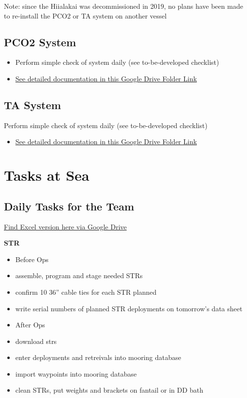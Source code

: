 \documentclass[]{book}
\providecommand{\tightlist}{%
  \setlength{\itemsep}{0pt}\setlength{\parskip}{0pt}}
\begin{document}
Note: since the Hiialakai was decommissioned in 2019, no plans have been
made to re-install the PCO2 or TA system on another vessel

\section{PCO2 System}\label{pco2-system}

\begin{itemize}
\tightlist
\item
  Perform simple check of system daily (see to-be-developed checklist)
\item
  \href{https://drive.google.com/drive/folders/1p-Evjb3zrw4Kk460knsl4rI4m2Un_jyy}{See
  detailed documentation in this Google Drive Folder Link}
\end{itemize}

\section{TA System}\label{ta-system}

Perform simple check of system daily (see to-be-developed checklist)

\begin{itemize}
\tightlist
\item
  \href{https://drive.google.com/drive/folders/1p-Evjb3zrw4Kk460knsl4rI4m2Un_jyy}{See
  detailed documentation in this Google Drive Folder Link}
\end{itemize}

\hypertarget{tasks}{\chapter{Tasks at Sea}\label{tasks}}

\section{Daily Tasks for the Team}\label{daily-tasks-for-the-team}

\href{https://drive.google.com/open?id=1I4Hojo0qjKtUwhRqgc9aLM6_fGtjqZMM}{Find
Excel version here via Google Drive}

\textbf{STR}

\begin{itemize}
\tightlist
\item
  Before Ops
\item
  assemble, program and stage needed STRs
\item
  confirm 10 36'' cable ties for each STR planned
\item
  write serial numbers of planned STR deployments on tomorrow's data
  sheet
\item
  After Ops
\item
  download strs
\item
  enter deployments and retreivals into mooring database
\item
  import waypoints into mooring database
\item
  clean STRs, put weights and brackets on fantail or in DD bath
\end{itemize}
\end{document}
